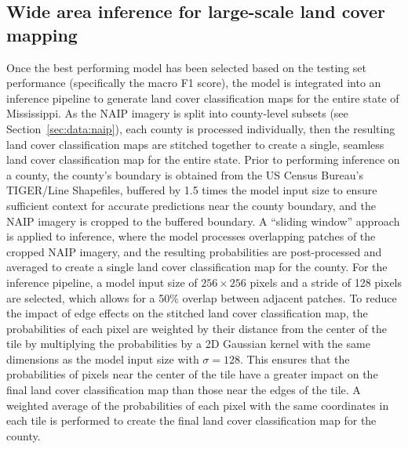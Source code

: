 \subsection{Wide area inference for large-scale land cover mapping}
Once the best performing model has been selected based on the testing set performance (specifically the macro F1 score), the model is integrated into an inference pipeline to generate land cover classification maps for the entire state of Mississippi.
As the NAIP imagery is split into county-level subsets (see Section~\ref{sec:data:naip}), each county is processed individually, then the resulting land cover classification maps are stitched together to create a single, seamless land cover classification map for the entire state.
Prior to performing inference on a county, the county's boundary is obtained from the US Census Bureau's TIGER/Line Shapefiles, buffered by 1.5 times the model input size to ensure sufficient context for accurate predictions near the county boundary, and the NAIP imagery is cropped to the buffered boundary.
A ``sliding window'' approach is applied to inference, where the model processes overlapping patches of the cropped NAIP imagery, and the resulting probabilities are post-processed and averaged to create a single land cover classification map for the county.
For the inference pipeline, a model input size of \(256 \times 256\) pixels and a stride of 128 pixels are selected, which allows for a 50\% overlap between adjacent patches.
To reduce the impact of edge effects on the stitched land cover classification map, the probabilities of each pixel are weighted by their distance from the center of the tile by multiplying the probabilities by a 2D Gaussian kernel with the same dimensions as the model input size with \(\sigma=128\).
This ensures that the probabilities of pixels near the center of the tile have a greater impact on the final land cover classification map than those near the edges of the tile.
A weighted average of the probabilities of each pixel with the same coordinates in each tile is performed to create the final land cover classification map for the county.

